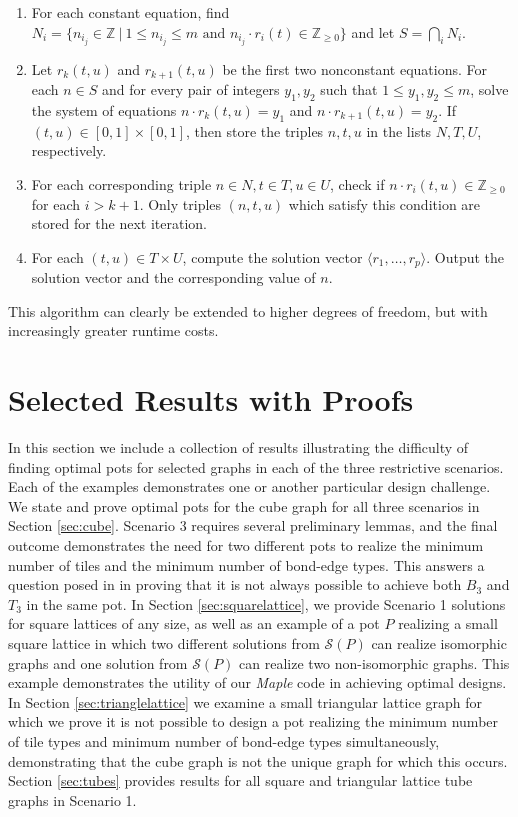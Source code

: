 \documentclass{elsarticle}
\theoremstyle{definition}
\theoremstyle{remark}
\theoremstyle{plain}
\theoremstyle{plain}
\begin{document}
\begin{enumerate}
\begin{enumerate}
            \item For each constant equation, find $N_i = \{n_{i_j} \in \mathbb{Z} \: | \: 1 \leq n_{i_j} \leq m \text{ and } n_{i_j} \cdot r_i(t) \in \mathbb{Z}_{\geq 0} \}$ and let $S = \displaystyle \bigcap_i N_i$.
            \item Let $r_k(t,u)$ and $r_{k+1}(t,u)$ be the first two nonconstant equations. For each $n \in S$ and for every pair of integers $y_1, y_2$ such that $1 \leq y_1, y_2 \leq m$, solve the system of equations $n \cdot r_k(t,u) = y_1$ and $n \cdot r_{k+1}(t,u) = y_2$. If $(t,u) \in [0,1] \times [0,1]$, then store the triples $n, t, u$ in the lists $N, T, U$, respectively. 
            \item For each corresponding triple $n \in N, t \in T, u \in U$, check if $n \cdot r_i(t,u) \in \mathbb{Z}_{\geq 0}$ for each $i > k+1$. Only triples $(n,t,u)$ which satisfy this condition are stored for the next iteration.
            \item For each $(t,u) \in T \times U$, compute the solution vector $\langle r_1, \ldots, r_p \rangle$. Output the solution vector and the corresponding value of $n$. 
        \end{enumerate}
\end{enumerate}

This algorithm can clearly be extended to higher degrees of freedom, but with increasingly greater runtime costs.


\section{Selected Results with Proofs}\label{sec:SelectedResults}
 In this section we include a collection of results illustrating the difficulty of finding optimal pots for selected graphs  in each of the three restrictive scenarios.  Each of the examples demonstrates one or another particular design challenge.  We state and prove optimal pots for the cube graph  for all three scenarios in Section \ref{sec:cube}. Scenario 3 requires several preliminary lemmas, and the final outcome demonstrates the need for two different pots to realize the minimum number of tiles and the minimum number of bond-edge types. This answers a question posed in \cite{ellis2014minimal} in proving that it is not always possible to achieve both $B_3$ and $T_3$ in the same pot. In Section \ref{sec:squarelattice}, we provide Scenario 1 solutions for square lattices of any size, as well as an example of a pot $P$ realizing a small square lattice in which two different solutions from $\mathcal{S}(P)$ can realize isomorphic graphs and one solution from $\mathcal{S}(P)$ can realize two non-isomorphic graphs. This example demonstrates the utility of our \emph{Maple} code in achieving optimal designs. In Section \ref{sec:trianglelattice} we examine a small triangular lattice graph for which we prove it is not possible to design a pot realizing the minimum number of tile types and minimum number of bond-edge types simultaneously, demonstrating that the cube graph is not the unique graph for which this occurs. Section \ref{sec:tubes} provides results for all square and triangular lattice tube graphs in Scenario 1.  
\end{document}
